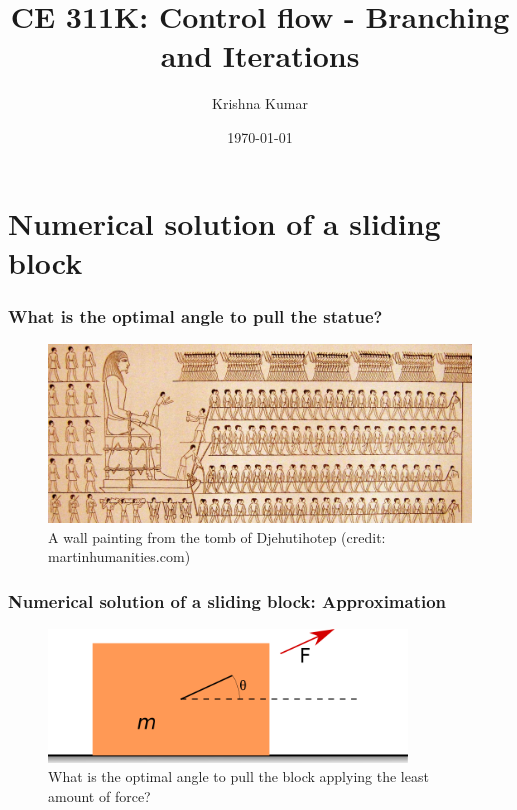 \documentclass[notes]{beamer}
\title[CE 311K: Control flow]{CE 311K: Control flow - Branching and Iterations}
\author{Krishna Kumar} %
\institute[UT Austin] %
{
University of Texas at Austin \\
\medskip
\href{mailto:krishnak@utexas.edu}{krishnak@utexas.edu} %
}
\date{\today} %
\begin{document}
\begin{frame}
\titlepage %
\end{frame}

\newif\ifshowtoc
\showtoctrue%

\AtBeginSection{%
	\ifshowtoc
	\begin{frame}
		\tableofcontents[currentsection, subsectionstyle=show/show/hide]
	\end{frame}
	\fi
}


\section{Numerical solution of a sliding block}
\begin{frame}
	\frametitle{What is the optimal angle to pull the statue?}
	\begin{figure}[ht]
		\centering
		\includegraphics[width=\textwidth]{figs/egypt-pyramid.jpg}
		\caption*{A wall painting from the tomb of Djehutihotep (credit: martinhumanities.com)}
	\end{figure}
\end{frame}

\begin{frame}
	\frametitle{Numerical solution of a sliding block: Approximation}
	\begin{figure}[ht]
		\centering
		\includegraphics[width=0.85\textwidth]{figs/sliding-block.png}
		\caption*{What is the optimal angle to pull the block applying the least amount of force?}
	\end{figure}
\end{frame}
\end{document}

